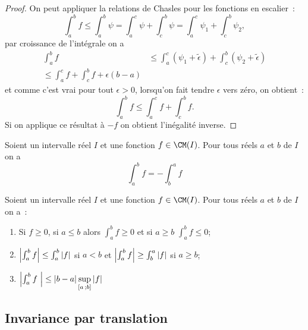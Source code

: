 \begin{proof}
  On peut appliquer la relations de Chasles pour les fonctions en escalier~:
  \begin{equation}
    \int_a^b f \leq \int_a^b \psi = \int_a^c \psi + \int_c^b \psi= \int_a^c \psi_1 + \int_c^b \psi_2,
  \end{equation}
  par croissance de l'intégrale on a
  \begin{align}
    \int_a^b f & \leq \int_a^c (\psi_1 + \tilde{\epsilon})  + \int_c^b (\psi_2 + \tilde{\epsilon}) \\
    \leq \int_a^c f + \int_c^b f + \epsilon(b-a)
  \end{align}
  et comme c'est vrai pour tout $\epsilon >0$, lorsqu'on fait tendre $\epsilon$ vers zéro, on obtient~:
  \begin{equation}
    \int_a^b f \leq \int_a^c f + \int_c^b f.
  \end{equation}
  Si on applique ce résultat à $-f$ on obtient l'inégalité inverse.
\end{proof}

\begin{prop}
  Soient un intervalle réel $I$ et une fonction $f \in \CM(I)$. Pour tous réels $a$ et $b$ de $I$ on a
  \begin{equation}
    \int_a^b f = - \int_b^a f
  \end{equation}
\end{prop}

\begin{theo}
  Soient un intervalle réel $I$ et une fonction $f \in \CM(I)$. Pour tous réels $a$ et $b$ de $I$ on a~:
  \begin{enumerate}
  \item Si $f \geq 0$, si $a \leq b$ alors $\int_a^bf \geq 0$ et si $a \geq b$ $\int_a^b f \leq 0$;
  \item $\left\lvert\int_a^b f\right\rvert \leq \int_a^b \left\lvert f\right\rvert$ si $a<b$ et $\left\lvert\int_a^b f\right\rvert \geq \int_b^a \left\lvert f\right\rvert$ si $a \geq b$;
  \item $\left\lvert\int_a^b f~\right\rvert \leq \left\lvert b-a\right\rvert \sup\limits_{\left[ a \, ;  b \right]} \left\lvert f\right\rvert$
  \end{enumerate}
\end{theo}

\subsection{Invariance par translation}

